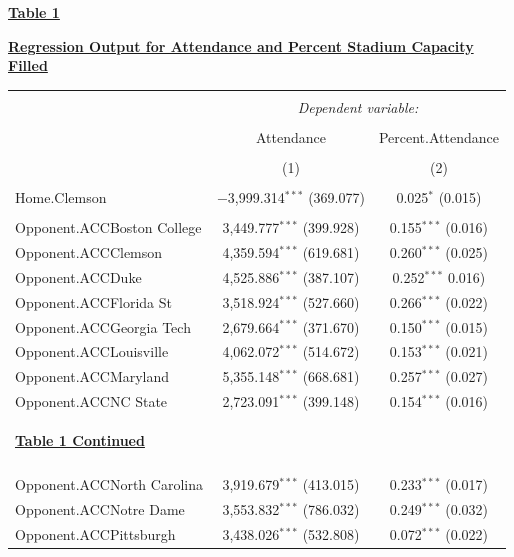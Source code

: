 \documentclass[preprint,12pt,times]{elsarticle}
\begin{document}
\begin{large}
\ul{\textbf{Table 1}}\hfill
\end{large}
\begin{center}{\textbf{\ul{Regression Output for Attendance and Percent Stadium Capacity Filled}}}
\begin{longtable}{@{\extracolsep{5pt}}lcc}
\\[-1.8ex]\hline 
\hline \\[-1.8ex] 
 & \multicolumn{2}{c}{\textit{Dependent variable:}} \\ 
\cline{2-3} 
\\[-1.8ex] & Attendance & Percent.Attendance \\ 
\\[-1.8ex] & (1) & (2)\\ 
\hline \\[-1.8ex] 
 Home.Clemson & $-$3,999.314$^{***}$ (369.077) & 0.025$^{*}$ (0.015)\\
 \\
 Opponent.ACCBoston College & 3,449.777$^{***}$ (399.928) & 0.155$^{***}$ (0.016) \\
 Opponent.ACCClemson & 4,359.594$^{***}$ (619.681) & 0.260$^{***}$ (0.025) \\ 
 Opponent.ACCDuke & 4,525.886$^{***}$ (387.107) & 0.252$^{***}$ 0.016)\\ 
 Opponent.ACCFlorida St & 3,518.924$^{***}$ (527.660) & 0.266$^{***}$ (0.022)\\ 
 Opponent.ACCGeorgia Tech & 2,679.664$^{***}$ (371.670) & 0.150$^{***}$ (0.015)\\ 
 Opponent.ACCLouisville & 4,062.072$^{***}$ (514.672) & 0.153$^{***}$ (0.021)\\
 Opponent.ACCMaryland & 5,355.148$^{***}$ (668.681) & 0.257$^{***}$ (0.027)\\ 
 Opponent.ACCNC State & 2,723.091$^{***}$ (399.148) & 0.154$^{***}$ (0.016) \\
 \newpage
\begin{large}
\ul{\textbf{Table 1 Continued}}\hfill
\end{large}\\
\hline \\[-1.8ex]
 Opponent.ACCNorth Carolina & 3,919.679$^{***}$ (413.015) & 0.233$^{***}$ (0.017)\\ 
 Opponent.ACCNotre Dame & 3,553.832$^{***}$ (786.032) & 0.249$^{***}$ (0.032)\\ 
 Opponent.ACCPittsburgh & 3,438.026$^{***}$ (532.808) & 0.072$^{***}$ (0.022)\\ 

\end{longtable}
\end{center}
\end{document}
